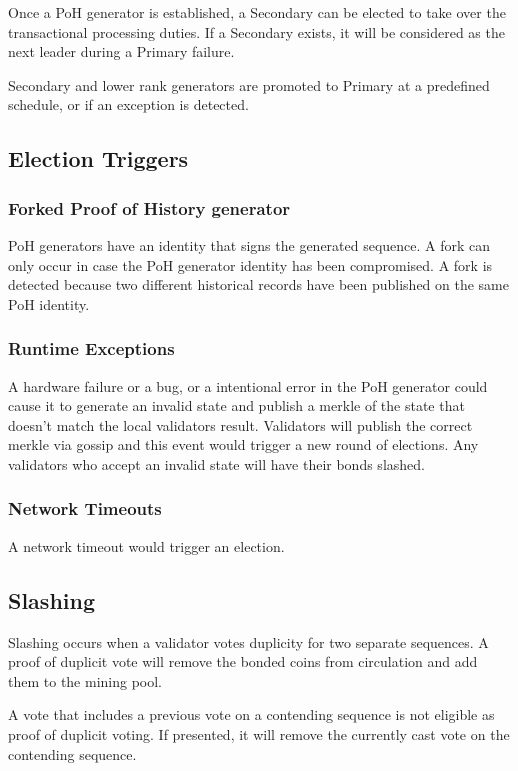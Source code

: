 \documentclass[12pt]{article}
\begin{document}
Once a PoH generator is established, a Secondary can be elected to take over the transactional processing duties. If a Secondary exists, it will be considered as the next leader during a Primary failure.

Secondary and lower rank generators are promoted to Primary at a predefined schedule, or if an exception is detected.
\subsection{Election Triggers}
\subsubsection{Forked Proof of History generator}

PoH generators have an identity that signs the generated sequence. A fork can only occur in case the PoH generator identity has been compromised. A fork is detected because two different historical records have been published on the same PoH identity.

\subsubsection{Runtime Exceptions}
A hardware failure or a bug, or a intentional error in the PoH generator could cause it to generate an invalid state and publish a merkle of the state that doesn’t match the local validators result. Validators will publish the correct merkle via gossip and this event would trigger a new round of elections. Any validators who accept an invalid state will have their bonds slashed.

\subsubsection{Network Timeouts}

A network timeout would trigger an election.

\subsection{Slashing}
Slashing occurs when a validator votes duplicity for two separate sequences. A proof of duplicit vote will remove the bonded coins from circulation and add them to the mining pool.

A vote that includes a previous vote on a contending sequence is not eligible as proof of duplicit voting. If presented, it will remove the currently cast vote on the contending sequence.
\end{document}
